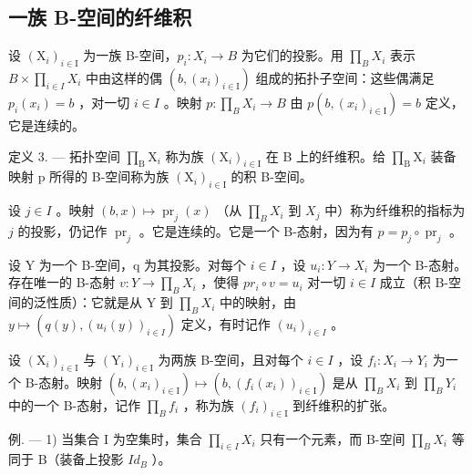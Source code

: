 \subsection{一族 B-空间的纤维积}

设 \((\mathrm{X}_{i})_{i\in\mathrm{I}}\) 为一族 B-空间，\(p_{i}\colon X_{i}\to B\) 为它们的投影。用 \(\prod_{B}X_{i}\) 表示 \(B\times\prod_{i\in I}X_{i}\) 中由这样的偶 \((b,(x_{i})_{i\in\mathrm{I}})\) 组成的拓扑子空间：这些偶满足 \(p_{i}(x_{i})=b\) ，对一切 \(i\in I\) 。映射 \(p\colon\prod_{B}X_{i}\to B\) 由 \(p(b,(x_{i})_{i\in\mathrm{I}})=b\) 定义，它是连续的。

定义 3. --- 拓扑空间 \(\prod_{\mathrm{B}} \mathrm{X}_i\) 称为族 \((\mathrm{X}_i)_{i \in \mathrm{I}}\) 在 B 上的纤维积。给 \(\prod_{\mathrm{B}} \mathrm{X}_i\) 装备映射 p 所得的 B-空间称为族 \((\mathrm{X}_i)_{i \in \mathrm{I}}\) 的积 B-空间。

设 \(j \in I\) 。映射 \((b, x) \mapsto \operatorname{pr}_j(x)\) （从 \(\prod_B X_i\) 到 \(X_j\) 中）称为纤维积的指标为 \(j\) 的投影，仍记作 \(\operatorname{pr}_j\) 。它是连续的。它是一个 B-态射，因为有 \(p = p_j \circ \operatorname{pr}_j\) 。

设 Y 为一个 B-空间，q 为其投影。对每个 \(i \in I\) ，设 \(u_i \colon Y \to X_i\) 为一个 B-态射。存在唯一的 B-态射 \(v \colon Y \to \prod_{B} X_i\) ，使得 \(pr_i \circ v = u_i\) 对一切 \(i \in I\) 成立（积 B-空间的泛性质）：它就是从 Y 到 \(\prod_{B} X_i\) 中的映射，由 \(y \mapsto (q(y), (u_i(y))_{i \in I})\) 定义，有时记作 \((u_i)_{i \in I}\) 。

设 \((\mathrm{X}_{i})_{i\in\mathrm{I}}\) 与 \((\mathrm{Y}_{i})_{i\in\mathrm{I}}\) 为两族 B-空间，且对每个 \(i\in I\) ，设 \(f_{i}\colon X_{i}\to Y_{i}\) 为一个 B-态射。映射 \((b,(x_{i})_{i\in\mathrm{I}})\mapsto(b,(f_{i}(x_{i}))_{i\in\mathrm{I}})\) 是从 \(\prod_{B}X_{i}\) 到 \(\prod_{B}Y_{i}\) 中的一个 B-态射，记作 \(\prod_{B}f_{i}\) ，称为族 \((f_{i})_{i\in\mathrm{I}}\) 到纤维积的扩张。

例. --- 1) 当集合 I 为空集时，集合 \(\prod_{i\in I}X_i\) 只有一个元素，而 B-空间 \(\prod_{B}X_{i}\) 等同于 B（装备上投影 \(Id_B\) ）。

